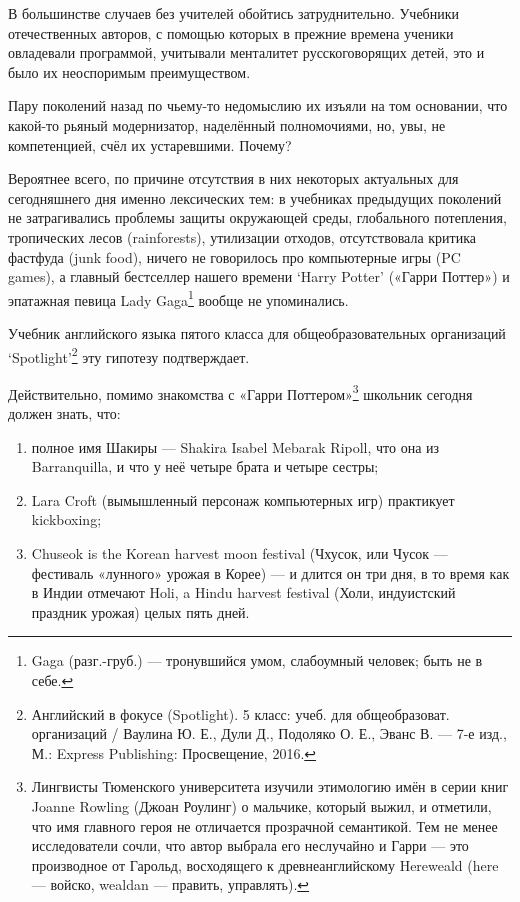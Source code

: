 В большинстве случаев без учителей обойтись затруднительно. Учебники отечественных авторов, с помощью которых в прежние времена ученики овладевали программой, учитывали менталитет русскоговорящих детей, это и было их неоспоримым преимуществом.

Пару поколений назад по чьему-то недомыслию их изъяли на том основании, что какой-то рьяный модернизатор, наделённый полномочиями, но, увы, не компетенцией, счёл их устаревшими. Почему?

Вероятнее всего, по причине отсутствия в них некоторых актуальных для сегодняшнего дня именно лексических тем: в учебниках предыдущих поколений не затрагивались проблемы защиты окружающей среды, глобального потепления, тропических лесов (rainforests), утилизации отходов, отсутствовала критика фастфуда (junk food), ничего не говорилось про компьютерные игры (PC games), а главный бестселлер нашего времени ‘Harry Potter’ («Гарри Поттер») и эпатажная певица Lady Gaga\footnote{Gaga (разг.-груб.) --- тронувшийся умом, слабоумный человек; быть не в себе.} вообще не упоминались.

Учебник английского языка пятого класса для общеобразовательных организаций ‘Spotlight’\footnote{Английский в фокусе (Spotlight). 5 класс: учеб. для общеобразоват. организаций / Ваулина Ю. Е., Дули Д., Подоляко О. Е., Эванс В. --- 7-е изд., М.: Express Publishing: Просвещение, 2016.} эту гипотезу подтверждает.

Действительно, помимо знакомства с «Гарри Поттером»\footnote{Лингвисты Тюменского университета изучили этимологию имён в серии книг Joanne Rowling (Джоан Роулинг) о мальчике, который выжил, и отметили, что имя главного героя не отличается прозрачной семантикой. Тем не менее исследователи сочли, что автор выбрала его неслучайно и Гарри --- это производное от Гарольд, восходящего к древнеанглийскому Hereweald (here --- войско, wealdan --- править, управлять).} школьник сегодня должен знать, что:

\begin{enumerate}
    \item полное имя Шакиры --- Shakira Isabel Mebarak Ripoll, что она из Barranquilla, и что у неё четыре брата и четыре сестры;
    \item Lara Croft (вымышленный персонаж компьютерных игр) практикует kickboxing;
    \item Chuseok is the Korean harvest moon festival (Чхусок, или Чусок --- фестиваль «лунного» урожая в Корее) --- и длится он три дня, в то время как в Индии отмечают Holi, a Hindu harvest festival (Холи, индуистский праздник урожая) целых пять дней.
\end{enumerate}

